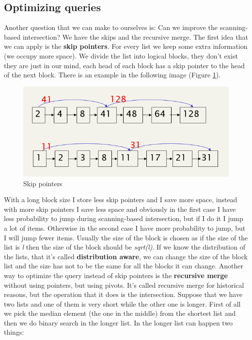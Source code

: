 \subsection{Optimizing queries}
Another question that we can make to ourselves is: Can we improve the scanning-based intersection? We have the skips and the recursive merge.\newline
The first idea that we can apply is the \textbf{skip pointers}. For every list we keep some extra information (we occupy more space). We divide the list into logical blocks, they don't exist they are just in our mind, each head of each block has a skip pointer to the head of the next block. There is an example in the following image (Figure \ref{fig:skip}).
\begin{figure}
    \centering
    \includegraphics{images/skip.png}
    \caption{Skip pointers}
    \label{fig:skip}
\end{figure}
With a long block size I store less skip pointers and I save more space, instead with more skip pointers I save less space and obviously in the first case I have less probability to jump during scanning-based intersection, but if I do it I jump a lot of items. Otherwise in the second case I have more probability to jump, but I will jump fewer items. Usually the size of the block is chosen as if the size of the list is \textit{l} then the size of the block should be \textit{sqrt(l)}. If we know the distribution of the lists, that it's called \textbf{distribution aware}, we can change the size of the block list and the size has not to be the same for all the blocks it can change.\newline
Another way to optimize the query instead of skip pointers is the \textbf{recursive merge} without using pointers, but using pivots. It's called recursive merge for historical reasons, but the operation that it does is the intersection.\newline
Suppose that we have two lists and one of them is very short while the other one is longer. First of all we pick the median element (the one in the middle) from the shortest list and then we do binary search in the longer list. In the longer list can happen two things:
